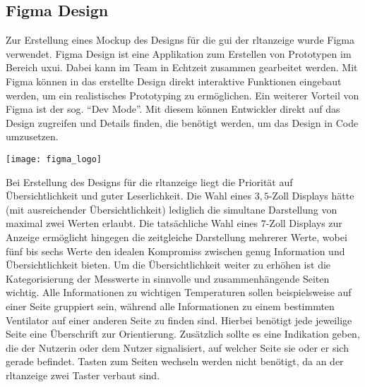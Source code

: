\subsection{Figma Design}\label{figma_design}
\begin{minipage}{0.6\textwidth}
    Zur Erstellung eines Mockup des Designs für die \acs{gui} der \acs{rltanzeige} wurde Figma verwendet. Figma Design ist eine Applikation zum Erstellen von Prototypen im Bereich \ac{uxui}. Dabei kann im Team in Echtzeit zusammen gearbeitet werden. Mit Figma können in das erstellte Design direkt interaktive Funktionen eingebaut werden, um ein realistisches Prototyping zu ermöglichen. Ein weiterer Vorteil von Figma ist der sog. \enquote{Dev Mode}. Mit diesem können Entwickler direkt auf das Design zugreifen und Details finden, die benötigt werden, um das Design in Code umzusetzen. \cite[vgl.][]{figma_design:o.J.}
\end{minipage}%
\hfill
\begin{minipage}{0.37\textwidth}
	\centering	
	\texttt{[image: figma\_logo]}
\end{minipage}
\vspace{1ex}

Bei Erstellung des Designs für die \acs{rltanzeige} liegt die Priorität auf Übersichtlichkeit und guter Leserlichkeit. Die Wahl eines $3,5$-Zoll Displays hätte (mit ausreichender Übersichtlichkeit) lediglich die simultane Darstellung von maximal zwei Werten erlaubt. Die tatsächliche Wahl eines $7$-Zoll Displays zur Anzeige ermöglicht hingegen die zeitgleiche Darstellung mehrerer Werte, wobei fünf bis sechs Werte den idealen Kompromiss zwischen genug Information und Übersichtlichkeit bieten. Um die Übersichtlichkeit weiter zu erhöhen ist die Kategorisierung der Messwerte in sinnvolle und zusammenhängende Seiten wichtig. Alle Informationen zu wichtigen Temperaturen sollen beispielsweise auf einer Seite gruppiert sein, während alle Informationen zu einem bestimmten Ventilator auf einer anderen Seite zu finden sind. Hierbei benötigt jede jeweilige Seite eine Überschrift zur Orientierung. Zusätzlich sollte es eine Indikation geben, die der Nutzerin oder dem Nutzer signalisiert, auf welcher Seite sie oder er sich gerade befindet. Tasten zum Seiten wechseln werden nicht benötigt, da an der \acs{rltanzeige} zwei Taster verbaut sind.

